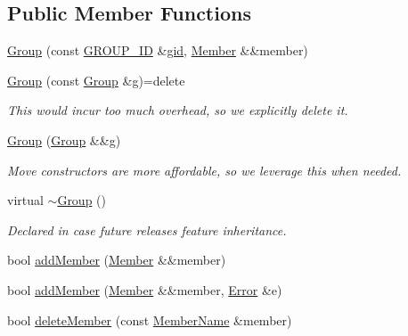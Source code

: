 \subsection*{Public Member Functions}
\begin{DoxyCompactItemize}
\item 
\hyperlink{classshaan97_1_1sync_1_1_group_a3f71060b1125acf84c8a6038a38caa5a}{Group} (const \hyperlink{namespaceshaan97_1_1sync_a34cebf175d27dfc3d82f24608f7043c1}{G\+R\+O\+U\+P\+\_\+\+ID} \&\hyperlink{classshaan97_1_1sync_1_1_group_a91de861ecc3bde21758b99e98ec08112}{gid}, \hyperlink{classshaan97_1_1sync_1_1_member}{Member} \&\&member)
\item 
\hyperlink{classshaan97_1_1sync_1_1_group_a959091a93465841d564abd3bdfa6a2d5}{Group} (const \hyperlink{classshaan97_1_1sync_1_1_group}{Group} \&g)=delete
\begin{DoxyCompactList}\small\item\em This would incur too much overhead, so we explicitly delete it. \end{DoxyCompactList}\item 
\hyperlink{classshaan97_1_1sync_1_1_group_af43934a8317bce6f5e397ffd8db3beef}{Group} (\hyperlink{classshaan97_1_1sync_1_1_group}{Group} \&\&g)
\begin{DoxyCompactList}\small\item\em Move constructors are more affordable, so we leverage this when needed. \end{DoxyCompactList}\item 
virtual \hyperlink{classshaan97_1_1sync_1_1_group_a2c2875d3cdf23d27031c362cfb123f96}{$\sim$\+Group} ()
\begin{DoxyCompactList}\small\item\em Declared in case future releases feature inheritance. \end{DoxyCompactList}\item 
bool \hyperlink{classshaan97_1_1sync_1_1_group_a68562104689d868509a0368675a7b51d}{add\+Member} (\hyperlink{classshaan97_1_1sync_1_1_member}{Member} \&\&member)
\item 
bool \hyperlink{classshaan97_1_1sync_1_1_group_ac780b07e1058acd909c0ffc3b8008da8}{add\+Member} (\hyperlink{classshaan97_1_1sync_1_1_member}{Member} \&\&member, \hyperlink{classshaan97_1_1sync_1_1_error}{Error} \&e)
\item 
bool \hyperlink{classshaan97_1_1sync_1_1_group_a16ad0f69a940568e36caad49b6401ae4}{delete\+Member} (const \hyperlink{namespaceshaan97_1_1sync_af59c2c9185f7cde547b79fbe0bf8ec71}{Member\+Name} \&member)

\end{DoxyCompactItemize}
